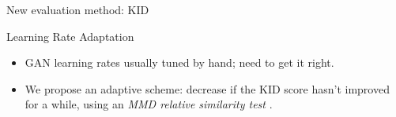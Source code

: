 \documentclass[xcolor={table}]{beamer}
\begin{document}
\begin{frame}{}
\begin{columns}[T, totalwidth=\textwidth]
\begin{column}{.32\textwidth}
\begin{block}{New evaluation method: KID}
    \end{block}

    \begin{block}{Learning Rate Adaptation}
      \begin{itemize}
        \item GAN learning rates usually tuned by hand; need to get it right.
        \item We propose an adaptive scheme: decrease if the KID score hasn't improved for a while, using an \emph{MMD relative similarity test} \citep{3sample}.
      \end{itemize}
    \end{block}

    \printbibliography
  \end{column}

\end{columns}


\end{frame}
\end{document}
